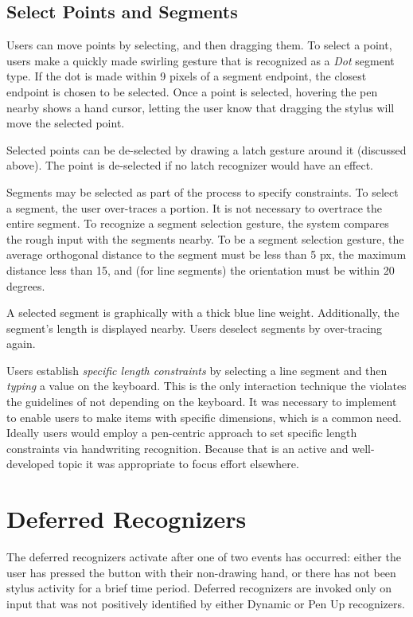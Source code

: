 

\subsection{Select Points and Segments}

Users can move points by selecting, and then dragging them. To select
a point, users make a quickly made swirling gesture that is recognized
as a \textit{Dot} segment type. If the dot is made within 9 pixels of
a segment endpoint, the closest endpoint is chosen to be
selected. Once a point is selected, hovering the pen nearby shows a
hand cursor, letting the user know that dragging the stylus will move
the selected point.

Selected points can be de-selected by drawing a latch gesture around it
(discussed above). The point is de-selected if no latch recognizer
would have an effect.

Segments may be selected as part of the process to specify  constraints. To select a segment, the user over-traces a
portion. It is not necessary to overtrace the entire segment. To
recognize a segment selection gesture, the system compares the rough
input with the segments nearby. To be a segment selection gesture, the
average orthogonal distance to the segment must be less than 5 px, the
maximum distance less than 15, and (for line segments) the orientation
must be within 20 degrees.

A selected segment is graphically with a thick blue line
weight. Additionally, the segment's length is displayed nearby. Users
deselect segments by over-tracing again.

Users establish \textit{specific length constraints} by selecting a
line segment and then \textit{typing} a value on the keyboard. This is
the only interaction technique the violates the guidelines of not
depending on the keyboard. It was necessary to implement to enable
users to make items with specific dimensions, which is a common
need. Ideally users would employ a pen-centric approach to set
specific length constraints via handwriting recognition. Because that
is an active and well-developed topic it was appropriate to focus
effort elsewhere.

\section{Deferred Recognizers}

The deferred recognizers activate after one of two events has occurred:
either the user has pressed the button with their non-drawing hand, or
there has not been stylus activity for a brief time period. Deferred
recognizers are invoked only on input that was not positively
identified by either Dynamic or Pen Up recognizers.

